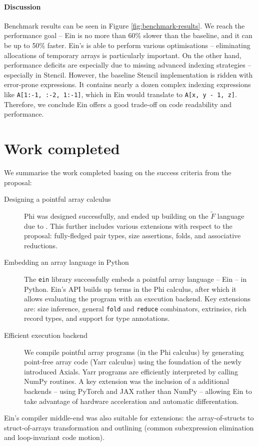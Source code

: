 \paragraph{Discussion} Benchmark results can be seen in Figure \ref{fig:benchmark-results}. 
We reach the performance goal -- Ein is no more than 60\% slower than the baseline, and it can be up to 50\% faster.
Ein's is able to perform various optimisations -- eliminating allocations of temporary arrays is particularly important. 
On the other hand, performance deficits are especially due to missing advanced indexing strategies -- especially in Stencil.
However, the baseline Stencil implementation is ridden with error-prone expressions. 
It contains nearly a dozen complex indexing expressions like \texttt{A[1:-1, :-2, 1:-1]}, which in Ein would translate to \texttt{A[x, y - 1, z]}.
Therefore, we conclude Ein offers a good trade-off on code readability and performance.


\section{Work completed}
\label{work-completed}

We summarise the work completed basing on the success criteria from the proposal: \begin{description}
    \item[Designing a pointful array calculus] Phi was designed successfully, and ended up building on the $\tilde F$ language due to \textcite{shaikhha2019efficient}. This further includes various extensions with respect to the proposal: fully-fledged pair types, size assertions, folds, and associative reductions.
    \item[Embedding an array language in Python] The \texttt{ein} library successfully embeds a pointful array language -- Ein -- in Python. Ein's API builds up terms in the Phi calculus, after which it allows evaluating the program with an execution backend. Key extensions are: size inference, general \texttt{fold} and \texttt{reduce} combinators, extrinsics, rich record types, and support for type annotations.
    \item[Efficient execution backend] We compile pointful array programs (in the Phi calculus) by generating point-free array code (Yarr calculus) using the foundation of the newly introduced Axials. Yarr programs are efficiently interpreted by calling NumPy routines. A key extension was the inclusion of a additional backends -- using PyTorch and JAX rather than NumPy -- allowing Ein to take advantage of hardware acceleration and automatic differentation.
\end{description}
Ein's compiler middle-end was also suitable for extensions: the array-of-structs to struct-of-arrays transformation and outlining (common subexpression elimination and loop-invariant code motion).


